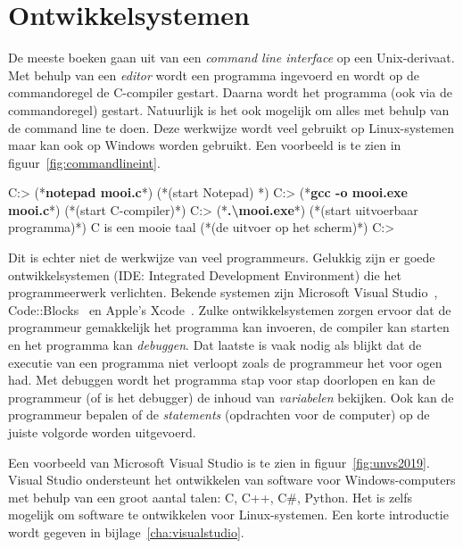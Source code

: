 \section{Ontwikkelsystemen}
De meeste boeken gaan uit van een \textsl{command line interface} op een Unix-derivaat. Met behulp van een \textsl{editor} wordt een programma ingevoerd en wordt op de commandoregel de C-compiler gestart. Daarna wordt het programma (ook via de commandoregel) gestart.
Natuurlijk is het ook mogelijk om alles met behulp van de command line te doen. Deze werkwijze wordt veel gebruikt op Linux-systemen maar kan ook op Windows worden gebruikt. Een voorbeeld is te zien in figuur~\ref{fig:commandlineint}.

\begin{dosbox}[title=Een voorbeeld van een command line interface.,label=fig:commandlineint]
C:\Users\Cbook> (*\textbf{notepad mooi.c}*) (*\hfill\textrm{(start Notepad)} *)
C:\Users\Cbook> (*\textbf{gcc -o mooi.exe mooi.c}*) (*\hfill\textrm{(start C-compiler)}*)
C:\Users\Cbook> (*\textbf{.\textbackslash mooi.exe}*) (*\hfill\textrm{(start uitvoerbaar programma)}*)
C is een mooie taal (*\hfill\textrm{(de uitvoer op het scherm)}*)
C:\Users\Cbook>
\end{dosbox}

Dit is echter niet de werkwijze van veel programmeurs. Gelukkig zijn er goede ontwikkelsystemen (IDE: Integrated Development Environment) die het programmeerwerk verlichten. Bekende systemen zijn Microsoft Visual Studio~\cite{vs2019}, Code::Blocks~\cite{codeblocks2020} en Apple's Xcode~\cite{xcode2020}.
Zulke ontwikkelsystemen zorgen ervoor dat de programmeur gemakkelijk het programma kan invoeren, de compiler kan starten en het programma kan \textsl{debuggen}. Dat laatste is vaak nodig als blijkt dat de executie van een programma niet verloopt zoals de programmeur het voor ogen had. Met debuggen wordt het programma stap voor stap doorlopen en kan de programmeur (of is het debugger) de inhoud van \textsl{variabelen} bekijken. Ook kan de programmeur bepalen of de \textsl{statements} (opdrachten voor de computer) op de juiste volgorde worden uitgevoerd.

Een voorbeeld van Microsoft Visual Studio is te zien in figuur~\ref{fig:unvs2019}. Visual Studio ondersteunt het ontwikkelen van software voor Windows-computers met behulp van een groot aantal talen: C, C++, C\#, Python. Het is zelfs mogelijk om software te ontwikkelen voor Linux-systemen. Een korte introductie wordt gegeven in bijlage~\ref{cha:visualstudio}.

